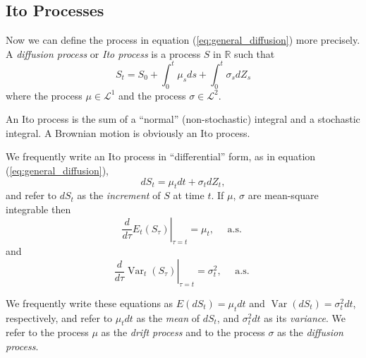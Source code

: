 \documentclass[\topdir/lecture\_notes.tex]{subfiles}
\begin{document}
\subsection{Ito Processes}
Now we can define the process in equation (\ref{eq:general_diffusion}) more precisely. A \emph{diffusion process} or \emph{Ito process} is a process $S$ in $\mathbb{R}$ such that
\begin{equation}
S_{t}=S_{0}+\int_{0}^{t} \mu_{s} ds+\int_{0}^{t} \sigma_{s} dZ_{s} \label{eq:ito_process}
\end{equation}
where the process $\mu \in \mathcal{L}^{1}$ and the process $\sigma \in \mathcal{L}^{2}$.

An Ito process is the sum of a ``normal'' (non-stochastic) integral and a stochastic integral. A Brownian motion is obviously an Ito process.

We frequently write an Ito process in ``differential'' form, as in equation (\ref{eq:general_diffusion}),
\begin{equation}
dS_{t}=\mu_{t} dt+\sigma_{t} dZ_{t}, \label{eq:ito_process_differential}
\end{equation}
and refer to $dS_{t}$ as the \emph{increment} of $S$ at time $t$. If $\mu$, $\sigma$ are mean-square integrable then
\begin{equation}
\left.\frac{d}{d \tau} E_{t}\left(S_{\tau}\right)\right|_{\tau=t}=\mu_{t}, \quad \text { a.s. }
\end{equation}
and
\begin{equation}
\left.\frac{d}{d \tau} \operatorname{Var}_{t}\left(S_{\tau}\right)\right|_{\tau=t}=\sigma_{t}^{2}, \quad \text { a.s. }
\end{equation}

We frequently write these equations as $E(dS_{t})=\mu_{t} dt$ and $\operatorname{Var}(dS_{t})=\sigma_{t}^{2} dt$, respectively, and refer to $\mu_{t} dt$ as the \emph{mean} of $dS_{t}$, and $\sigma_{t}^{2} dt$ as its \emph{variance}. We refer to the process $\mu$ as the \emph{drift process} and to the process $\sigma$ as the \emph{diffusion process}.
\end{document}

